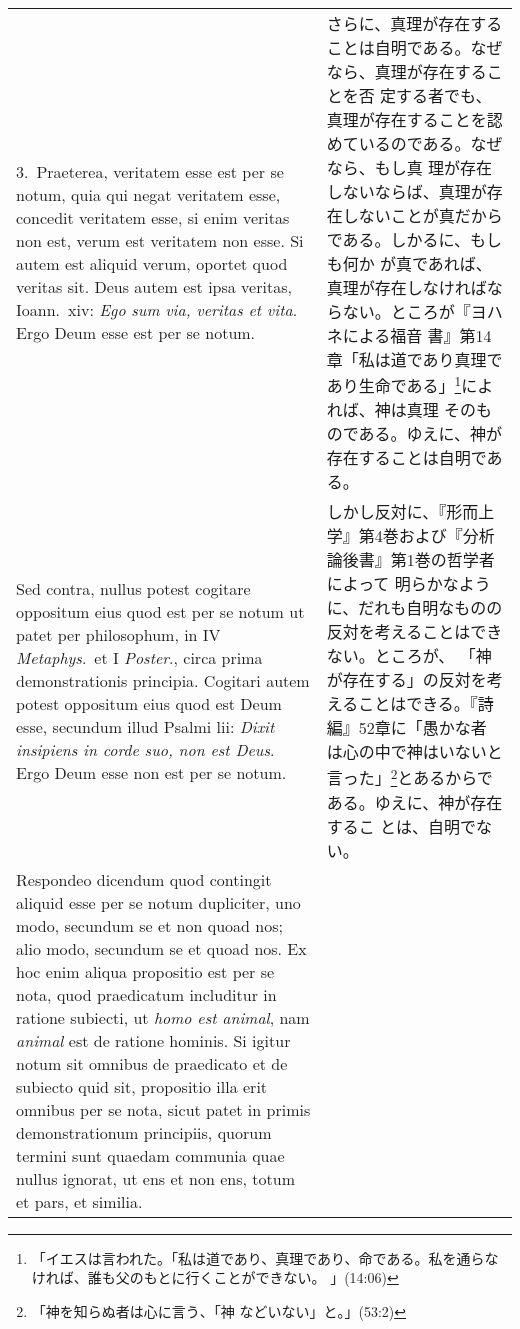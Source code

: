 \documentclass[10pt]{jsarticle} %
\begin{document}
\begin{longtable}{p{21em}p{21em}}
\\


3.~{\sc Praeterea}, veritatem esse est per se notum,
quia qui negat veritatem esse, concedit veritatem esse, si enim veritas
non est, verum est veritatem non esse. Si autem est aliquid verum,
oportet quod veritas sit. Deus autem est ipsa veritas, Ioann.~{\sc xiv}:
 {\it Ego sum via, veritas et vita}. Ergo Deum esse est per se notum.


&

さらに、真理が存在することは自明である。なぜなら、真理が存在することを否
 定する者でも、真理が存在することを認めているのである。なぜなら、もし真
 理が存在しないならば、真理が存在しないことが真だからである。しかるに、もしも何か
 が真であれば、真理が存在しなければならない。ところが『ヨハネによる福音
 書』第14章「私は道であり真理であり生命である」\footnote{「イエスは言われた。「私は道であり、真理であり、命である。私を通らなければ、誰も父のもとに行くことができない。 」(14:06)}によれば、神は真理
 そのものである。ゆえに、神が存在することは自明である。

\\


{\sc Sed contra}, nullus potest cogitare oppositum eius quod est per se
notum ut patet per philosophum, in IV {\it Metaphys}.~et I {\it
Poster}., circa prima demonstrationis principia. Cogitari autem potest
oppositum eius quod est Deum esse, secundum illud Psalmi {\sc lii}: {\it
Dixit insipiens in corde suo, non est Deus}. Ergo Deum esse non est per
se notum.


&
しかし反対に、『形而上学』第4巻および『分析論後書』第1巻の哲学者によって
 明らかなように、だれも自明なものの反対を考えることはできない。ところが、
 「神が存在する」の反対を考えることはできる。『詩編』52章に「愚かな者
 は心の中で神はいないと言った」\footnote{「神を知らぬ者は心に言う、「神
 などいない」と。」(53:2)}とあるからである。ゆえに、神が存在するこ
 とは、自明でない。

\\


{\sc Respondeo dicendum} quod contingit aliquid esse
per se notum dupliciter, uno modo, secundum se et non quoad nos; alio
modo, secundum se et quoad nos. Ex hoc enim aliqua propositio est per se
nota, quod praedicatum includitur in ratione subiecti, ut {\it homo est
animal}, nam {\it animal} est de ratione hominis. Si igitur notum sit omnibus
de praedicato et de subiecto quid sit, propositio illa erit omnibus per
se nota, sicut patet in primis demonstrationum principiis, quorum
termini sunt quaedam communia quae nullus ignorat, ut ens et non ens,
totum et pars, et similia. 



\end{longtable}
\end{document}
